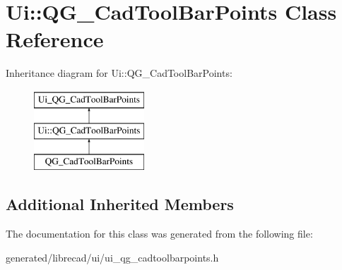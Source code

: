 \hypertarget{classUi_1_1QG__CadToolBarPoints}{\section{Ui\-:\-:Q\-G\-\_\-\-Cad\-Tool\-Bar\-Points Class Reference}
\label{classUi_1_1QG__CadToolBarPoints}
}
Inheritance diagram for Ui\-:\-:Q\-G\-\_\-\-Cad\-Tool\-Bar\-Points\-:\begin{figure}[H]
\begin{center}
\leavevmode
\includegraphics[height=3.000000cm]{classUi_1_1QG__CadToolBarPoints}
\end{center}
\end{figure}
\subsection*{Additional Inherited Members}


The documentation for this class was generated from the following file\-:\begin{DoxyCompactItemize}
\item 
generated/librecad/ui/ui\-\_\-qg\-\_\-cadtoolbarpoints.\-h\end{DoxyCompactItemize}
